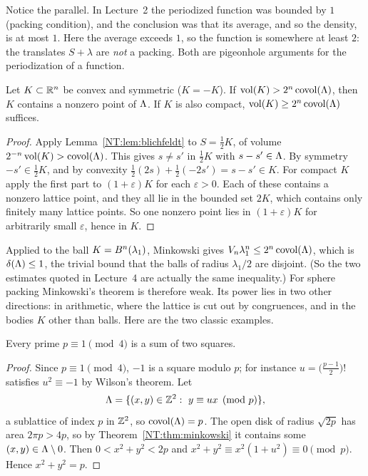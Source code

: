 Notice the parallel. In Lecture~2 the periodized function was bounded by $1$ (packing condition), and
the conclusion was that its average, and so the density, is at most $1$. Here the average exceeds $1$, so
the function is somewhere at least $2$: the translates $S+\lambda$ are \emph{not} a packing. Both are
pigeonhole arguments for the periodization of a function.

\begin{theorem}\label{NT:thm:minkowski}
Let $K\subset\mathbb{R}^n$ be convex and symmetric ($K=-K$). If $\operatorname{vol}(K)>2^n\operatorname{covol}(\Lambda)$, then $K$ contains a
nonzero point of $\Lambda$. If $K$ is also compact, $\operatorname{vol}(K)\ge2^n\operatorname{covol}(\Lambda)$ suffices.
\end{theorem}

\begin{proof}
Apply Lemma~\ref{NT:lem:blichfeldt} to $S=\frac12K$, of volume $2^{-n}\operatorname{vol}(K)>\operatorname{covol}(\Lambda)$. This
gives $s\ne s'$ in $\frac12K$ with $s-s'\in\Lambda$. By symmetry $-s'\in\frac12K$, and by convexity
$\frac12(2s)+\frac12(-2s')=s-s'\in K$. For compact $K$ apply the first part to $(1+\varepsilon)K$ for
each $\varepsilon>0$. Each of these contains a nonzero lattice point, and they all lie in the bounded set
$2K$, which contains only finitely many lattice points. So one nonzero point lies in $(1+\varepsilon)K$
for arbitrarily small $\varepsilon$, hence in $K$.
\end{proof}

\begin{remark}
Applied to the ball $K=B^n(\lambda_1)$, Minkowski gives $V_n\lambda_1^n\le2^n\operatorname{covol}(\Lambda)$, which
is $\delta(\Lambda)\le1$, the trivial bound that the balls of radius $\lambda_1/2$ are disjoint. (So the two
estimates quoted in Lecture~4 are actually the same inequality.) For sphere packing Minkowski's theorem
is therefore weak. Its power lies in two other directions: in arithmetic, where the lattice is
cut out by congruences, and in the bodies $K$ other than balls. Here are the two classic examples.
\end{remark}

\begin{theorem}[Fermat]\label{NT:thm:fermat}
Every prime $p\equiv1\pmod4$ is a sum of two squares.
\end{theorem}

\begin{proof}
Since $p\equiv1\pmod4$, $-1$ is a square modulo $p$; for instance $u=\big(\frac{p-1}2\big)!$ satisfies
$u^2\equiv-1$ by Wilson's theorem. Let
\[
  \Lambda=\{(x,y)\in\mathbb{Z}^2:\ y\equiv ux\pmod p\},
\]
a sublattice of index $p$ in $\mathbb{Z}^2$, so $\operatorname{covol}(\Lambda)=p$. The open disk of radius $\sqrt{2p}$ has area
$2\pi p>4p$, so by Theorem~\ref{NT:thm:minkowski} it contains some $(x,y)\in\Lambda\setminus0$. Then
$0<x^2+y^2<2p$ and $x^2+y^2\equiv x^2(1+u^2)\equiv0\pmod p$. Hence $x^2+y^2=p$.
\end{proof}

